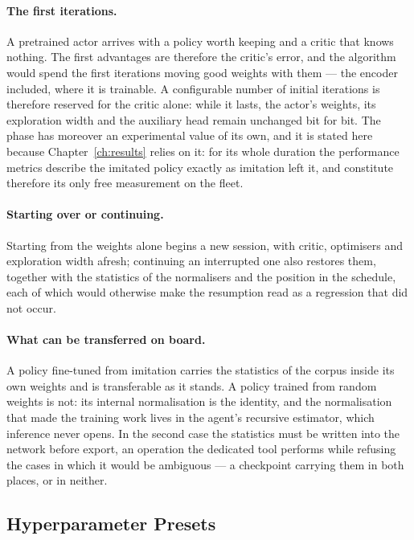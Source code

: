 \paragraph{The first iterations.}
A pretrained actor arrives with a policy worth keeping and a critic that knows
nothing. The first advantages are therefore the critic's error, and the
algorithm would spend the first iterations moving good weights with them --- the
encoder included, where it is trainable. A configurable number of initial
iterations is therefore reserved for the critic alone: while it lasts, the
actor's weights, its exploration width and the auxiliary head remain unchanged
bit for bit. The phase has moreover an experimental value of its own, and it is
stated here because Chapter~\ref{ch:results} relies on it: for its whole
duration the performance metrics describe the imitated policy exactly as
imitation left it, and constitute therefore its only free measurement on the
fleet.

\paragraph{Starting over or continuing.}
Starting from the weights alone begins a new session, with critic, optimisers
and exploration width afresh; continuing an interrupted one also restores them,
together with the statistics of the normalisers and the position in the
schedule, each of which would otherwise make the resumption read as a regression
that did not occur.

\paragraph{What can be transferred on board.}
A policy fine-tuned from imitation carries the statistics of the corpus inside its
own weights and is transferable as it stands. A policy trained from random
weights is not: its internal normalisation is the identity, and the
normalisation that made the training work lives in the agent's recursive
estimator, which inference never opens. In the second case the statistics must
be written into the network before export, an operation the dedicated tool
performs while refusing the cases in which it would be ambiguous --- a
checkpoint carrying them in both places, or in neither.

\subsection{Hyperparameter Presets}
\label{sec:rl-presets}

